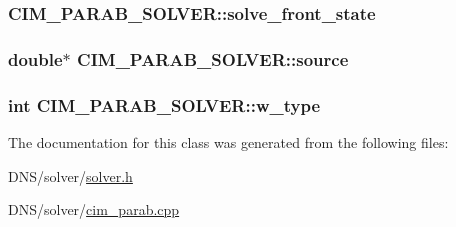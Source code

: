 \subsubsection[{\texorpdfstring{solve\+\_\+front\+\_\+state}{solve_front_state}}]{ C\+I\+M\+\_\+\+P\+A\+R\+A\+B\+\_\+\+S\+O\+L\+V\+E\+R\+::solve\+\_\+front\+\_\+state}\hypertarget{class_c_i_m___p_a_r_a_b___s_o_l_v_e_r_a2c9947245814af07934448644a82bd0f}{}\label{class_c_i_m___p_a_r_a_b___s_o_l_v_e_r_a2c9947245814af07934448644a82bd0f}
\subsubsection[{\texorpdfstring{source}{source}}]{\setlength{\rightskip}{0pt plus 5cm}double$\ast$ C\+I\+M\+\_\+\+P\+A\+R\+A\+B\+\_\+\+S\+O\+L\+V\+E\+R\+::source}\hypertarget{class_c_i_m___p_a_r_a_b___s_o_l_v_e_r_af4f64348a853dde56a82be580ede23da}{}\label{class_c_i_m___p_a_r_a_b___s_o_l_v_e_r_af4f64348a853dde56a82be580ede23da}
\subsubsection[{\texorpdfstring{w\+\_\+type}{w_type}}]{\setlength{\rightskip}{0pt plus 5cm}int C\+I\+M\+\_\+\+P\+A\+R\+A\+B\+\_\+\+S\+O\+L\+V\+E\+R\+::w\+\_\+type}\hypertarget{class_c_i_m___p_a_r_a_b___s_o_l_v_e_r_a724aa9e3012621a5c7e8cb0f49f5f25e}{}\label{class_c_i_m___p_a_r_a_b___s_o_l_v_e_r_a724aa9e3012621a5c7e8cb0f49f5f25e}


The documentation for this class was generated from the following files\+:\begin{DoxyCompactItemize}
\item 
D\+N\+S/solver/\hyperlink{solver_8h}{solver.\+h}\item 
D\+N\+S/solver/\hyperlink{cim__parab_8cpp}{cim\+\_\+parab.\+cpp}\end{DoxyCompactItemize}
